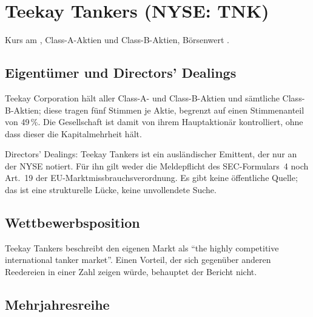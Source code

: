 \section{Teekay Tankers (NYSE: TNK)}
\label{sec:tnk}

Kurs  am \TnkKursDatum{},
\Mio{\TnkAktienA}{} Class-A-Aktien und \Mio{\TnkAktienB}{} Class-B-Aktien,
B\"orsenwert .

\subsection{Eigent\"umer und Directors' Dealings}

Teekay Corporation h\"alt \Pz{\TnkTeekayAnteil} aller Class-A- und Class-B-Aktien und
s\"amtliche Class-B-Aktien; diese tragen f\"unf Stimmen je Aktie, begrenzt auf einen
Stimmenanteil von 49\,\%. Die Gesellschaft ist damit von ihrem
Hauptaktion\"ar kontrolliert, ohne dass dieser die Kapitalmehrheit h\"alt.

Directors' Dealings: Teekay Tankers ist ein ausl\"andischer Emittent, der nur an der NYSE
notiert. F\"ur ihn gilt weder die Meldepflicht des SEC-Formulars~4 noch Art.~19 der
EU-Markt\-miss\-brauchs\-ver\-ord\-nung. Es gibt keine \"offentliche Quelle; das ist eine
strukturelle L\"ucke, keine unvollendete Suche.

\subsection{Wettbewerbsposition}

Teekay Tankers beschreibt den eigenen Markt als \enquote{the highly competitive
international tanker market}. Einen Vorteil, der sich gegen\"uber anderen
Reedereien in einer Zahl zeigen w\"urde, behauptet der Bericht nicht.


\subsection{Mehrjahresreihe}


